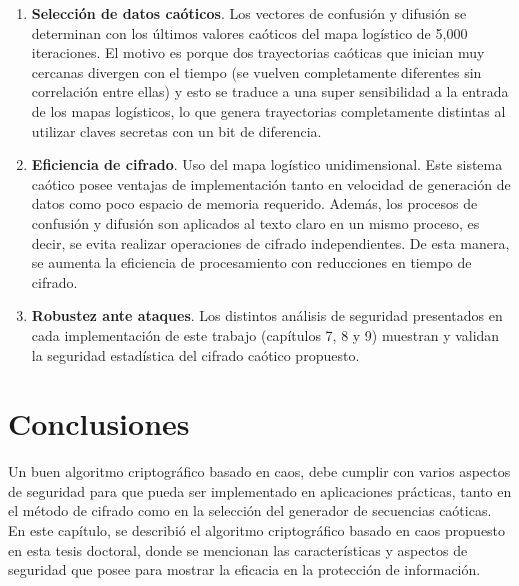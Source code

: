 \begin{enumerate}
\item \textbf{Selección de datos caóticos}. Los vectores de confusión y difusión se determinan con los últimos valores caóticos del mapa logístico de 5,000 iteraciones. El motivo es porque dos trayectorias caóticas que inician muy cercanas divergen con el tiempo (se vuelven completamente diferentes sin correlación entre ellas) y esto se traduce a una super sensibilidad a la entrada de los mapas logísticos, lo que genera trayectorias completamente distintas al utilizar claves secretas con un bit de diferencia. 
\item \textbf{Eficiencia de cifrado}. Uso del mapa logístico unidimensional. Este sistema caótico posee ventajas de implementación tanto en velocidad de generación de datos como poco espacio de memoria requerido. Además, los procesos de confusión y difusión son aplicados al texto claro en un mismo proceso, es decir, se evita realizar operaciones de cifrado independientes. De esta manera, se aumenta la eficiencia de procesamiento con reducciones en tiempo de cifrado.   
\item \textbf{Robustez ante ataques}. Los distintos análisis de seguridad presentados en cada implementación de este trabajo (capítulos 7, 8 y 9) muestran y validan la seguridad estadística del cifrado caótico propuesto.  
\end{enumerate}

\section{Conclusiones}
Un buen algoritmo criptográfico basado en caos, debe cumplir con varios aspectos de seguridad para que pueda ser implementado en aplicaciones prácticas, tanto en el método de cifrado como en la selección del generador de secuencias caóticas. En este capítulo, se describió el algoritmo criptográfico basado en caos propuesto en esta tesis doctoral, donde se mencionan las características y aspectos de seguridad que posee para mostrar la eficacia en la protección de información.  






